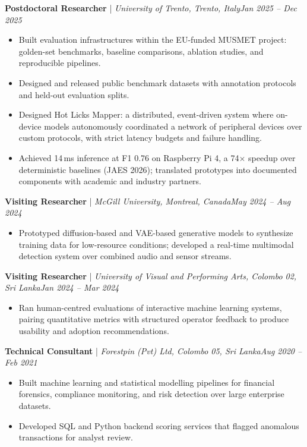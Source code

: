 \documentclass[11pt]{article}
\newenvironment{cvrole}[5]{%
  \par\noindent\textbf{\large #1} | \textit{\small #2, #3}\hfill \textit{\small #4 -- #5}\par
  \begin{itemize}[leftmargin=2em, itemsep=-0.3em, topsep=-0.4em]%
}{%
  \end{itemize}\par\noindent\mbox{}\par\vspace{-0.1em}%
}
\begin{document}
\begin{cvrole}{Postdoctoral Researcher}{University of Trento}{Trento, Italy}{Jan 2025}{Dec 2025}
    \item Built evaluation infrastructures within the EU-funded MUSMET project: golden-set benchmarks, baseline comparisons, ablation studies, and reproducible pipelines.
    \item Designed and released public benchmark datasets with annotation protocols and held-out evaluation splits.
    \item Designed Hot Licks Mapper: a distributed, event-driven system where on-device models autonomously coordinated a network of peripheral devices over custom protocols, with strict latency budgets and failure handling.
    \item Achieved 14\,ms inference at F1 0.76 on Raspberry Pi 4, a 74$\times$ speedup over deterministic baselines (JAES 2026); translated prototypes into documented components with academic and industry partners.
\end{cvrole}

\begin{cvrole}{Visiting Researcher}{McGill University}{Montreal, Canada}{May 2024}{Aug 2024}
    \item Prototyped diffusion-based and VAE-based generative models to synthesize training data for low-resource conditions; developed a real-time multimodal detection system over combined audio and sensor streams.
\end{cvrole}

\begin{cvrole}{Visiting Researcher}{University of Visual and Performing Arts}{Colombo 02, Sri Lanka}{Jan 2024}{Mar 2024}
    \item Ran human-centred evaluations of interactive machine learning systems, pairing quantitative metrics with structured operator feedback to produce usability and adoption recommendations.
\end{cvrole}

\begin{cvrole}{Technical Consultant}{Forestpin (Pvt) Ltd}{Colombo 05, Sri Lanka}{Aug 2020}{Feb 2021}
    \item Built machine learning and statistical modelling pipelines for financial forensics, compliance monitoring, and risk detection over large enterprise datasets.
    \item Developed SQL and Python backend scoring services that flagged anomalous transactions for analyst review.
\end{cvrole}
\end{document}
